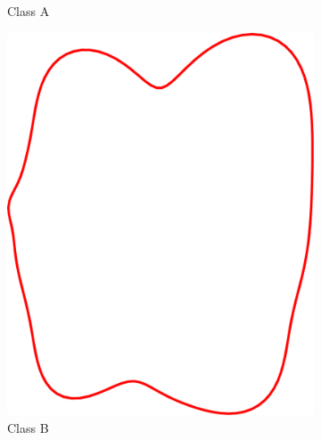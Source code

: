 \documentclass[pdftex,12pt,a4paper]{report}
\begin{document}
\begin{figure}[h]
\begin{subfigure}[b]{0.24\textwidth}
		\caption{Class A}
		\label{subfig:synthetic-classes:a-2}
	\end{subfigure}
	\begin{subfigure}[b]{0.24\textwidth}
		\centering
		\includegraphics[width=.9\linewidth]{img/synthetic-generation/classes/2-1.pdf}
		\caption{Class B}
		\label{subfig:synthetic-classes:b-1}
	\end{subfigure}
	\begin{subfigure}[b]{0.24\textwidth}
		\centering

\end{subfigure}
\end{figure}
\end{document}
